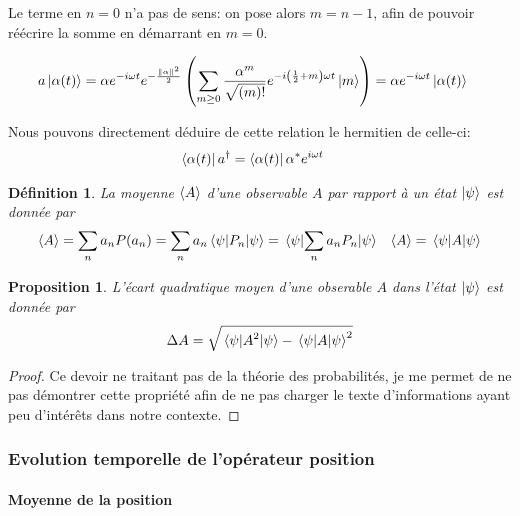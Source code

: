 \documentclass[11pt,oneside,a4paper]{article}
\newtheorem{definition}[theorem]{Définition}
\newtheorem{property}[theorem]{Proposition}
\begin{document}
Le terme en $n = 0$ n'a pas de sens: on pose alors $m=n-1$, afin de pouvoir réécrire la somme en démarrant en $m = 0$.

\begin{align}
  a\ket{\alpha(t)} &= \alpha e^{-i\omega t}e^{-\frac{\norm{\alpha}^2}{2}}\left(\sum_{m\geq 0}\frac{\alpha^{m}}{\sqrt{(m)!}}e^{-i\left(\frac{1}{2}+m    \right)\omega t}\ket{m}\right) = \alpha e^{-i\omega t}\ket{\alpha(t)}
\end{align}

Nous pouvons directement déduire de cette relation le hermitien de celle-ci:
\begin{align}
  \bra{\alpha(t)}a^\dagger &= \bra{\alpha(t)}\alpha^*e^{i\omega t}
\end{align}

\begin{definition}
  La moyenne $\expval{A}$ d'une observable $A$ par rapport à un état $\ket{\psi}$ est donnée par
  \begin{align}
    \expval{A} &= \sum_n a_nP(a_n) = \sum_n a_n \expval{P_n}{\psi} = \expval{\sum_n a_nP_n}{\psi} &\expval{A} = \expval{A}{\psi} 
  \end{align}
\end{definition}

\begin{property}
  L'écart quadratique moyen d'une obserable $A$ dans l'état $\ket{\psi}$ est donnée par
  \begin{align}
    \label{ecart quadratique moyen}
    \Delta A = \sqrt{\expval{A^2}{\psi} - \expval{A}{\psi}^2}
  \end{align}
\end{property}
\begin{proof}
  Ce devoir ne traitant pas de la théorie des probabilités, je me permet de ne pas démontrer cette propriété afin de ne pas charger le texte d'informations ayant peu d'intérêts dans notre contexte.
\end{proof}

\subsubsection{Evolution temporelle de l'opérateur position}
\label{Evolution temporelle de l'opérateur position}

\paragraph{Moyenne de la position}
\end{document}
